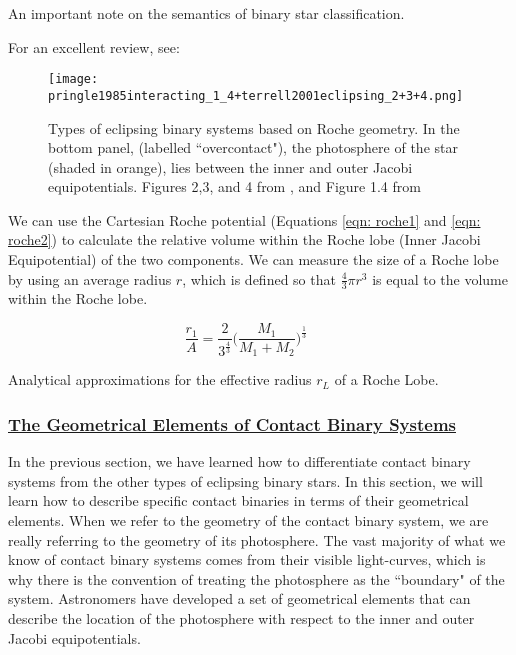 \documentclass[12pt]{article} %
\numberwithin{equation}{section} %
\begin{document}
An important note on the semantics of binary star classification. \citet{kuiper1941interpretation}

For an excellent review, see: \citep{kallrath2009eclipsing}

\begin{figure}[H]
\centering
\texttt{[image: pringle1985interacting\_1\_4+terrell2001eclipsing\_2+3+4.png]}
\caption{Types of eclipsing binary systems based on Roche geometry. In the bottom panel, (labelled ``overcontact"), the photosphere of the star (shaded in orange), lies between the inner and outer Jacobi equipotentials. Figures 2,3, and 4 from \citet{terrell2001eclipsing}, and Figure 1.4 from \citet{pringle1985interacting}}
\label{fig: pringle1985interacting_1_4+terrell2001eclipsing_2+3+4}
\end{figure}

We can use the Cartesian Roche potential (Equations \ref{eqn: roche1} and \ref{eqn: roche2}) to calculate the relative volume within the Roche lobe (Inner Jacobi Equipotential) of the two components. We can measure the size of a Roche lobe by using an average radius $r$, which is defined so that $\frac{4}{3} \pi r^{3}$ is equal to the volume within the Roche lobe.

\citet{paczynski1971evolutionary}

\begin{equation} \label{paczynski1971evolutionary_4}
\frac{r_{1}}{A} = \frac{2}{3^{\frac{4}{3}}} \Big( \frac{M_{1}}{M_{1} + M_{2}} \Big)^{\frac{1}{3}} \qquad 
\end{equation}

Analytical approximations for the effective radius $r_{L}$ of a Roche Lobe. \citet{eggleton1983approximation}

\subsubsection[The Geometrical Elements of Contact Binary Systems]{\hyperlink{toc}{The Geometrical Elements of Contact Binary Systems}} \label{sec: The Geometrical Elements of Contact Binary Systems}

In the previous section, we have learned how to differentiate contact binary systems from the other types of eclipsing binary stars. In this section, we will learn how to describe specific contact binaries in terms of their geometrical elements. When we refer to the geometry of the contact binary system, we are really referring to the geometry of its photosphere. The vast majority of what we know of contact binary systems comes from their visible light-curves, which is why there is the convention of treating the photosphere as the ``boundary" of the system. Astronomers have developed a set of geometrical elements that can describe the location of the photosphere with respect to the inner and outer Jacobi equipotentials. 
\end{document}
